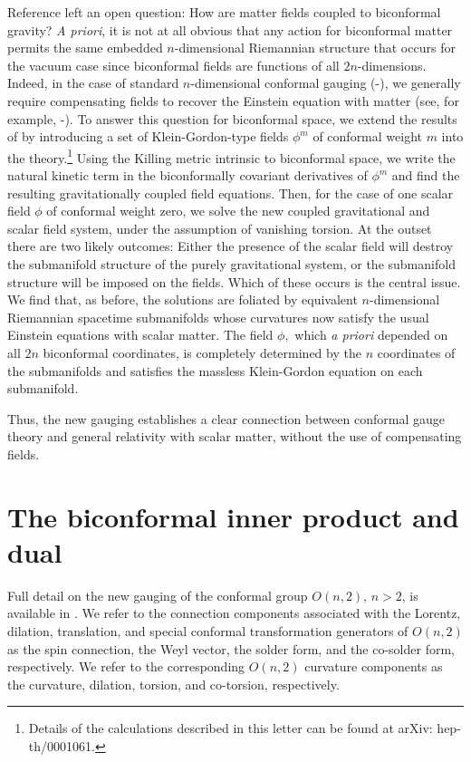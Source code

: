 \documentclass[a4paper,a4paper]{article}
\begin{document}
Reference \cite{WW} left an open question: How are matter fields coupled to
biconformal gravity? \textit{A priori}, it is not at all obvious that any
action for biconformal matter permits the same embedded $n$-dimensional
Riemannian structure that occurs for the vacuum case since biconformal
fields are functions of all $2n$-dimensions. Indeed, in the case of standard $n$-dimensional conformal gauging (\cite{Romao+Ferber+Freund}-\cite{Kaku+Townsend2}), we generally require compensating fields to recover the Einstein equation with
matter (see, for example, \cite{Deser}-\cite{van Nieuwenhuizen}). To answer
this question for biconformal space, we extend the results of \cite{WW} by
introducing a set of Klein-Gordon-type fields $\phi ^{m}$ of conformal
weight $m$ into the theory.\footnote{%
Details of the calculations described in this letter can be found at arXiv:
hep-th/0001061.} Using the Killing metric intrinsic to biconformal space, we
write the natural kinetic term in the biconformally covariant derivatives of 
$\phi ^{m}$ and find the resulting gravitationally coupled field equations.
Then, for the case of one scalar field $\phi $ of conformal weight zero, we
solve the new coupled gravitational and scalar field system, under the
assumption of vanishing torsion. At the outset there are two likely
outcomes: Either the presence of the scalar field will destroy the
submanifold structure of the purely gravitational system, or the submanifold
structure will be imposed on the fields. Which of these occurs is the
central issue. We find that, as before, the solutions are foliated by
equivalent $n$-dimensional Riemannian spacetime submanifolds whose
curvatures now satisfy the usual Einstein equations with scalar matter. The
field $\phi ,$ which \textit{a priori }depended on all $2n$ biconformal
coordinates, is completely determined by the $n$ coordinates of the
submanifolds and satisfies the massless Klein-Gordon equation on each
submanifold.

Thus, the new gauging establishes a clear connection between conformal gauge
theory and general relativity with scalar matter, without the use of
compensating fields.

\section{The biconformal inner product and dual}

Full detail on the new gauging of the conformal group $O(n,2)$, $n>2$, is
available in \cite{New Conformal Gauging Paper}. We refer to the connection
components associated with the Lorentz, dilation, translation, and special
conformal transformation generators of $O(n,2)$ as the spin connection, the
Weyl vector, the solder form, and the co-solder form, respectively. We refer
to the corresponding $O(n,2)$ curvature components as the curvature,
dilation, torsion, and co-torsion, respectively.
\end{document}
